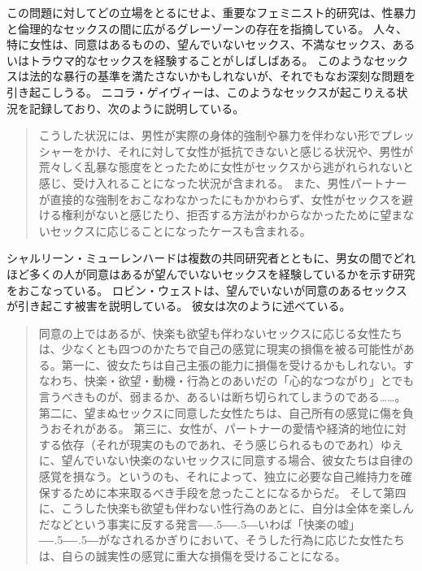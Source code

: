 \documentclass[paper=a4,book,openany]{jlreq}
\newcommand{\ig}[1]{}           %
\def\DDASH{―\kern-.5\zw―\kern-.5\zw―} %
\begin{document}
この問題に対してどの立場をとるにせよ、重要なフェミニスト的研究は、性暴力と倫理的なセックスの間に広がるグレーゾーンの存在を指摘している。
人々、特に女性は、同意はあるものの、望んでいないセックス、不満なセックス、あるいはトラウマ的なセックスを経験することがしばしばある。
このようなセックスは法的な暴行の基準を満たさないかもしれないが、それでもなお深刻な問題を引き起こしうる。
ニコラ・ゲイヴィー\ig{Nicola Gavey}は、このようなセックスが起こりえる状況を記録しており、次のように説明している。

\begin{quote}
こうした状況には、男性が実際の身体的強制や暴力を伴わない形でプレッシャーをかけ、それに対して女性が抵抗できないと感じる状況や、男性が荒々しく乱暴な態度をとったために女性がセックスから逃がれられないと感じ、受け入れることになった状況が含まれる。
また、男性パートナーが直接的な強制をおこなわなかったにもかかわらず、女性がセックスを避ける権利がないと感じたり、拒否する方法がわからなかったために望まないセックスに応じることになったケースも含まれる。
\citep[p.136]{gavey04:_just_sex}
\end{quote}

シャルリーン・ミューレンハードは複数の共同研究者とともに、男女の間でどれほど多くの人が同意はあるが望んでいないセックスを経験しているかを示す研究をおこなっている\citep[cf.][]{muehlenhard05:_wantin_not_wantin_sex,peterson07:_concep_wanted_women_consen_noncon_sexual_exper}。
ロビン・ウェスト\ig{Robin West}は、望んでいないが同意のあるセックスが引き起こす被害を説明している。
彼女は次のように述べている。

\begin{quote}
同意の上ではあるが、快楽も欲望も伴わないセックスに応じる女性たちは、少なくとも四つのかたちで自己の感覚に現実の損傷を被る可能性がある。第一に、彼女たちは自己主張の能力に損傷を受けるかもしれない。すなわち、快楽・欲望・動機・行為とのあいだの「心的なつながり」とでも言うべきものが、弱まるか、あるいは断ち切られてしまうのである……。第二に、望まぬセックスに同意した女性たちは、自己所有の感覚に傷を負うおそれがある。
第三に、女性が、パートナーの愛情や経済的地位に対する依存（それが現実のものであれ、そう感じられるものであれ）ゆえに、望んでいない快楽のないセックスに同意する場合、彼女たちは自律の感覚を損なう。というのも、それによって、独立に必要な自己維持力を確保するために本来取るべき手段を怠ったことになるからだ。
そして第四に、こうした快楽も欲望も伴わない性行為のあとに、自分は全体を楽しんだなどという事実に反する発言{\DDASH}いわば「快楽の嘘」{\DDASH}がなされるかぎりにおいて、そうした行為に応じた女性たちは、自らの誠実性の感覚に重大な損傷を受けることになる。\citep[p.53]{west95:_harms_of_consen_sex}
\end{quote}
\end{document}
